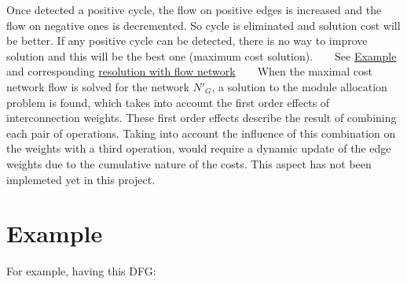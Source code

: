  Once detected a positive cycle, the flow on positive edges is increased and the flow on negative ones is decremented. So cycle is eliminated and solution cost will be better. If any positive cycle can be detected, there is no way to improve solution and this will be the best one (maximum cost solution). ~\newline
~\newline
 See \hyperlink{src_HLS_module_binding_page_Example}{Example} and corresponding \hyperlink{src_HLS_module_binding_page_example_flow}{resolution with flow network} ~\newline
~\newline
 When the maximal cost network flow is solved for the network $ N'_G $, a solution to the module allocation problem is found, which takes into account the first order effects of interconnection weights. These first order effects describe the result of combining each pair of operations. Taking into account the influence of this combination on the weights with a third operation, would require a dynamic update of the edge weights due to the cumulative nature of the costs. This aspect has not been implemeted yet in this project.~\newline
 \hypertarget{src_HLS_module_binding_page_Example}{}\section{Example}\label{src_HLS_module_binding_page_Example}
For example, having this D\+FG\+:


